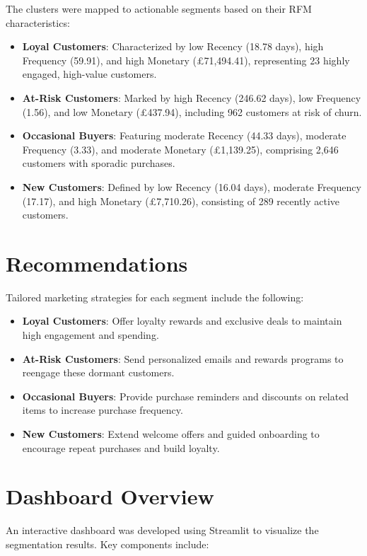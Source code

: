 \documentclass[a4paper,12pt]{article}
\begin{document}
The clusters were mapped to actionable segments based on their RFM characteristics:
\begin{itemize}
    \item \textbf{Loyal Customers}: Characterized by low Recency (18.78 days), high Frequency (59.91), and high Monetary (£71,494.41), representing 23 highly engaged, high-value customers.
    \item \textbf{At-Risk Customers}: Marked by high Recency (246.62 days), low Frequency (1.56), and low Monetary (£437.94), including 962 customers at risk of churn.
    \item \textbf{Occasional Buyers}: Featuring moderate Recency (44.33 days), moderate Frequency (3.33), and moderate Monetary (£1,139.25), comprising 2,646 customers with sporadic purchases.
    \item \textbf{New Customers}: Defined by low Recency (16.04 days), moderate Frequency (17.17), and high Monetary (£7,710.26), consisting of 289 recently active customers.
\end{itemize}

\section{Recommendations}

Tailored marketing strategies for each segment include the following:
\begin{itemize}
    \item \textbf{Loyal Customers}: Offer loyalty rewards and exclusive deals to maintain high engagement and spending.
    \item \textbf{At-Risk Customers}: Send personalized emails and rewards programs to reengage these dormant customers.
    \item \textbf{Occasional Buyers}: Provide purchase reminders and discounts on related items to increase purchase frequency.
    \item \textbf{New Customers}: Extend welcome offers and guided onboarding to encourage repeat purchases and build loyalty.
\end{itemize}

\section{Dashboard Overview}

An interactive dashboard was developed using Streamlit to visualize the segmentation results. Key components include:
\end{document}
